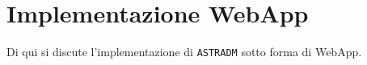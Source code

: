 \chapter{Implementazione WebApp}
Di qui si discute l'implementazione di \texttt{ASTRADM} sotto forma
di WebApp.



